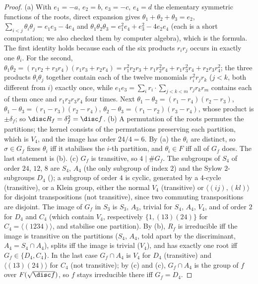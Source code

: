 \begin{proof}
(a) With $e_1=-a$, $e_2=b$, $e_3=-c$, $e_4=d$ the elementary symmetric functions of the roots, direct expansion gives $\theta_1+\theta_2+\theta_3=e_2$,
$\sum_{i<j}\theta_i\theta_j=e_1e_3-4e_4$ and $\theta_1\theta_2\theta_3=e_1^2e_4+e_3^2-4e_2e_4$ (each is a short computation; we also checked them by computer algebra),
which is the formula. The first identity holds because each of the six products $r_ir_j$ occurs in exactly one $\theta_i$. For the second,
$\theta_1\theta_2=(r_1r_2+r_3r_4)(r_1r_3+r_2r_4)=r_1^2r_2r_3+r_1r_2^2r_4+r_1r_3^2r_4+r_2r_3r_4^2$; the three products $\theta_i\theta_j$ together contain each of the
twelve monomials $r_i^2r_jr_k$ ($j<k$, both different from $i$) exactly once, while $e_1e_3=\sum_ir_i\cdot\sum_{j<k<m}r_jr_kr_m$ contains each of them once and
$r_1r_2r_3r_4$ four times. Next $\theta_1-\theta_2=(r_1-r_4)(r_2-r_3)$, $\theta_1-\theta_3=(r_1-r_3)(r_2-r_4)$, $\theta_2-\theta_3=(r_1-r_2)(r_3-r_4)$, whose product is $\pm\delta_f$;
so $\disc R_f=\delta_f^2=\disc f$.
(b) A permutation of the roots permutes the partitions; the kernel consists of the permutations preserving each partition, which is $V_4$, and the image has
order $24/4=6$. By (a) the $\theta_i$ are distinct, so $\sigma\in G_f$ fixes $\theta_i$ iff it stabilises the $i$-th partition, and $\theta_i\in F$ iff all of $G_f$ does.
The last statement is (b).
(c) $G_f$ is transitive, so $4\mid\#G_f$. The subgroups of $S_4$ of order $24$, $12$, $8$ are $S_4$, $A_4$ (the only subgroup of index $2$) and the Sylow $2$-subgroups
$D_4$ (); a subgroup of order $4$ is cyclic, generated by a $4$-cycle (transitive), or a Klein group, either the normal $V_4$ (transitive) or
$\langle(ij),(kl)\rangle$ for disjoint transpositions (not transitive), since two commuting transpositions are disjoint. The image of $G_f$ in $S_3$ is $S_3$, $A_3$,
trivial for $S_4$, $A_4$, $V_4$, and of order $2$ for $D_4$ and $C_4$ (which contain $V_4$, respectively $\{1,(13)(24)\}$ for $C_4=\langle(1234)\rangle$, and stabilise one
partition). By (b), $R_f$ is irreducible iff the image is transitive on the partitions ($S_4$, $A_4$, told apart by the discriminant, $A_4=S_4\cap A_4$), splits iff the
image is trivial ($V_4$), and has exactly one root iff $G_f\in\{D_4,C_4\}$. In the last case $G_f\cap A_4$ is $V_4$ for $D_4$ (transitive) and
$\langle(13)(24)\rangle$ for $C_4$ (not transitive); by (c) and (c), $G_f\cap A_4$ is the group of $f$
over $F(\sqrt{\disc f})$, so $f$ stays irreducible there iff $G_f=D_4$.
\end{proof}

